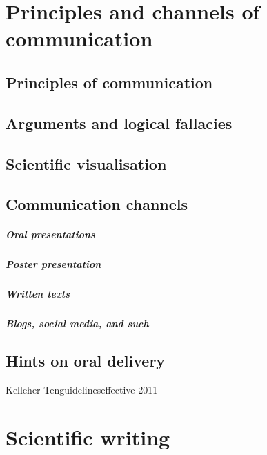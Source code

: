 \documentclass{tufte-book}
\begin{document}
\chapter{Principles and channels of communication}


\section{Principles of communication}



\section{Arguments and logical fallacies}


\section{Scientific visualisation}


\section{Communication channels}

\paragraph{Oral presentations}

\paragraph{Poster presentation}

\paragraph{Written texts}

\paragraph{Blogs, social media, and such}


\section{Hints on oral delivery}



Kelleher-Tenguidelineseffective-2011




\chapter{Scientific writing}
\end{document}

